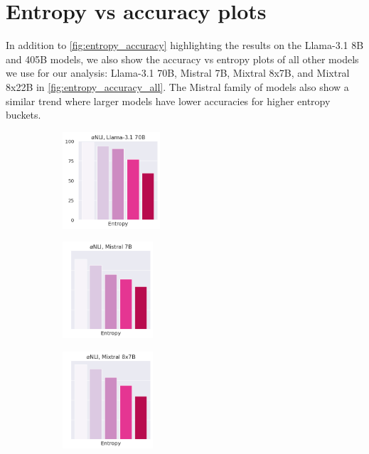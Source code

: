 

\section{Entropy vs accuracy plots}\label{app:entropy_vs_accuracy}

In addition to \cref{fig:entropy_accuracy} highlighting the results on the Llama-3.1 8B and 405B models, we also show the accuracy vs entropy plots of all other models we use for our analysis: Llama-3.1 70B, Mistral 7B, Mixtral 8x7B, and Mixtral 8x22B in \cref{fig:entropy_accuracy_all}. The Mistral family of models also show a similar trend where larger models have lower accuracies for higher entropy buckets.

\begin{figure}[t]
    \centering
    \begin{subfigure}[b]{0.23\textwidth}
        \includegraphics[height=3.6cm]{figures/appendix/entropy_acc_abductivenli_70B}
    \end{subfigure}
    \begin{subfigure}[b]{0.23\textwidth}
        \includegraphics[height=3.6cm]{figures/appendix/entropy_acc_abductivenli_7B}
    \end{subfigure}
    \begin{subfigure}[b]{0.23\textwidth}
        \includegraphics[height=3.6cm]{figures/appendix/entropy_acc_abductivenli_8x7B}

\end{subfigure}
\end{figure}
